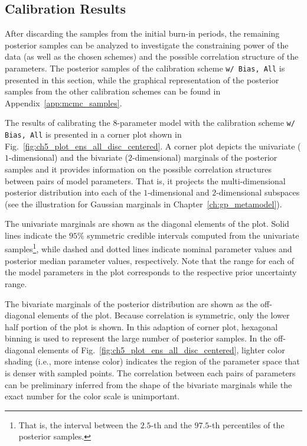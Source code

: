 \subsection{Calibration Results}\label{sub:bc_calibration_results}

After discarding the samples from the initial burn-in periods,
the remaining posterior samples can be analyzed to investigate the constraining power of the data (as well as the chosen schemes) and the possible correlation structure of the parameters.
The posterior samples of the calibration scheme \texttt{w/ Bias, All} is presented in this section, while the graphical representation of the posterior samples from the other calibration schemes can be found in Appendix~\ref{app:mcmc_samples}.

The results of calibrating the $8$-parameter model with the calibration scheme \texttt{w/ Bias, All} is presented in a corner plot shown in Fig.~\ref{fig:ch5_plot_ens_all_disc_centered}.
A corner plot \cite{Foreman-Mackey2016} depicts the univariate ($1$-dimensional) and the bivariate ($2$-dimen\-sional) marginals of the posterior samples and it provides information on the possible correlation structures between pairs of model parameters.
That is, it projects the multi-dimensional posterior distribution into each of the $1$-dimensional and $2$-dimensional subspaces (see the illustration for Gaussian marginals in Chapter~\ref{ch:gp_metamodel}).

The univariate marginals are shown as the diagonal elements of the plot.
Solid lines indicate the $95\%$ symmetric credible intervals computed from the univariate samples\footnote{That is, the interval between the $2.5$-th and the $97.5$-th percentiles of the posterior samples.}, while dashed and dotted lines indicate nominal parameter values and posterior median parameter values, respectively.
Note that the range for each of the model parameters in the plot corresponds to the respective prior uncertainty range.

The bivariate marginals of the posterior distribution are shown as the off-diagonal elements of the plot.
Because correlation is symmetric, only the lower half portion of the plot is shown.
In this adaption of corner plot, hexagonal binning \cite{Carr2015} is used to represent the large number of posterior samples.
In the off-diagonal elements of Fig.~\ref{fig:ch5_plot_ens_all_disc_centered}, lighter color shading (i.e., more intense color) indicates the region of the parameter space that is denser with sampled points.
The correlation between each pairs of parameters can be preliminary inferred from the shape of the bivariate marginals while the exact number for the color scale is unimportant.

